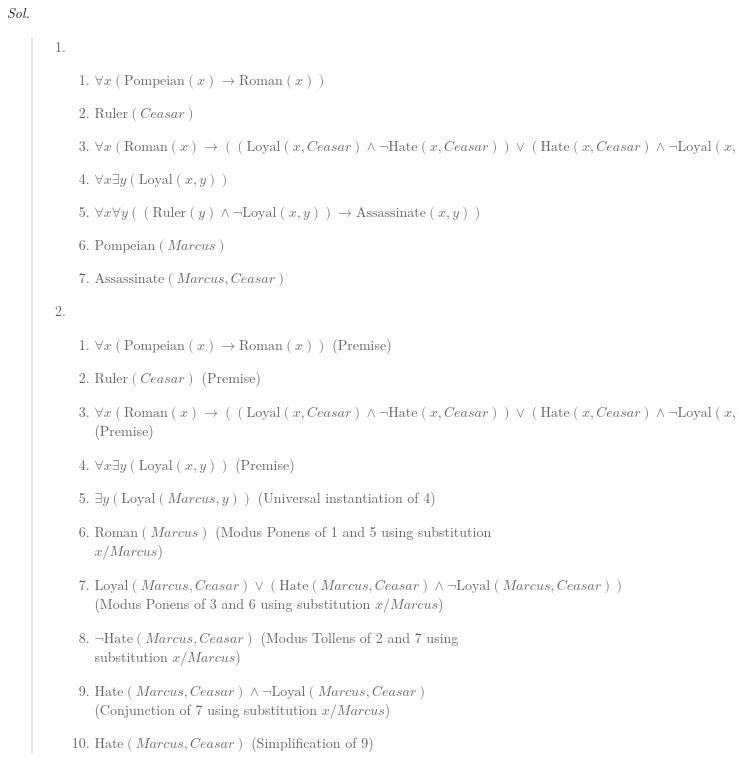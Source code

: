 \documentclass{article}
\theoremstyle{definition}
\newcommand{\<}{\langle}
\renewcommand{\>}{\rangle}
\begin{document}
\begin{enumerate}[label=\textbf{\arabic*.}]
  \vspace{1em} 
  \textit{ Sol. }
  \begin{quote}
  \begin{enumerate}
    \item 

      \begin{enumerate}
        \item $\forall x(\text{Pompeian}(x) \rightarrow \text{Roman}(x))$
        \item $\text{Ruler}(Ceasar)$
        \item $\forall x(\text{Roman}(x) \rightarrow ((\text{Loyal}(x,Ceasar) \land \neg \text{Hate}(x,Ceasar)) \lor(\text{Hate}(x,Ceasar) \land \neg \text{Loyal}(x,Ceasar))))$
        \item $\forall x \exists y(\text{Loyal}(x,y))$
        \item $\forall x \forall y((\text{Ruler}(y) \land \neg \text{Loyal}(x,y)) \rightarrow \text{Assassinate}(x,y))$
        \item $\text{Pompeian}(Marcus)$
        \item $\text{Assassinate}(Marcus,Ceasar)$
      \end{enumerate}
      \vspace{0.5em}
    \item

      \begin{enumerate}[label=\arabic*.]
        \item $\forall x(\text{Pompeian}(x) \rightarrow \text{Roman}(x))$ (Premise)
        \item $\text{Ruler}(Ceasar)$ (Premise)
        \item $\forall x(\text{Roman}(x) \rightarrow ((\text{Loyal}(x,Ceasar) \land \neg \text{Hate}(x,Ceasar)) \lor(\text{Hate}(x,Ceasar) \land \neg \text{Loyal}(x,Ceasar))))$ (Premise)
        \item $\forall x \exists y(\text{Loyal}(x,y))$ (Premise)
        \item $\exists y(\text{Loyal}(Marcus,y))$ (Universal instantiation of 4)
        \item $\text{Roman}(Marcus)$ (Modus Ponens of 1 and 5 using substitution $x/Marcus$)
        \item $\text{Loyal}(Marcus,Ceasar) \lor (\text{Hate}(Marcus,Ceasar) \land \neg \text{Loyal}(Marcus,Ceasar))$ (Modus Ponens of 3 and 6 using substitution $x/Marcus$)
        \item $\neg \text{Hate}(Marcus,Ceasar)$ (Modus Tollens of 2 and 7 using substitution $x/Marcus$)
        \item $\text{Hate}(Marcus,Ceasar) \land \neg \text{Loyal}(Marcus,Ceasar)$ (Conjunction of 7 using substitution $x/Marcus$)
        \item $\text{Hate}(Marcus,Ceasar)$ (Simplification of 9)
    \end{enumerate}
\end{enumerate}

\end{quote}

\end{enumerate}
\end{document}
